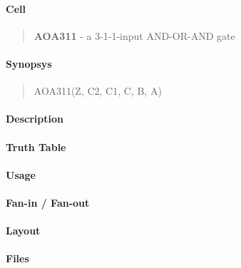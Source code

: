 \label{AOA311}
\paragraph{Cell}
\begin{quote}
    \textbf{AOA311} - a 3-1-1-input AND-OR-AND gate
\end{quote}

\paragraph{Synopsys}
\begin{quote}
    AOA311(Z, C2, C1, C, B, A)
\end{quote}

\paragraph{Description}

%

\paragraph{Truth Table}
%

\paragraph{Usage}

\paragraph{Fan-in / Fan-out}

\paragraph{Layout}

\paragraph{Files}
